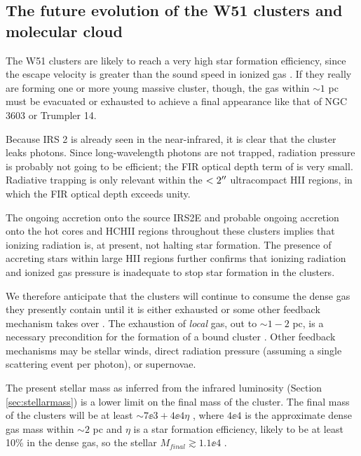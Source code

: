
\subsection{The future evolution of the W51 clusters and molecular cloud}
The W51 clusters are likely to reach a very high star formation efficiency,
since the escape velocity is greater than the sound speed in ionized gas
\citep{Ginsburg2012a,Bressert2012a}.  If they really are forming one or more
young massive cluster, though, the gas within $\sim 1$ pc must be evacuated or
exhausted to achieve a final appearance like that of NGC 3603 or Trumpler 14.

Because IRS 2 is already seen in the near-infrared, it is clear that
the cluster leaks photons.  Since long-wavelength photons are not trapped,
radiation pressure is probably not going to be efficient; the FIR optical depth
term of \citet{Murray2010a} is very small.  Radiative trapping is only
relevant within the $<2\mbox{$^{\prime\prime}$}$ ultracompact HII regions, in which the FIR optical
depth exceeds unity.

The ongoing accretion onto the source IRS2E and probable ongoing accretion onto
the hot cores and HCHII regions throughout these clusters implies that ionizing
radiation is, at present, not halting star formation.  The presence of
accreting stars within large HII regions further confirms that ionizing
radiation and ionized gas pressure is inadequate to stop star formation in the
clusters.

We therefore anticipate that the clusters will continue to consume the dense
gas they presently contain until it is either exhausted or some other feedback
mechanism takes over \citep{Ginsburg2012a,Bressert2012a,Ginsburg2015a}.  The
exhaustion of \emph{local} gas, out to $\sim1-2$ pc, is a necessary
precondition for the formation of a bound cluster \citep{Kruijssen2012a}.
Other feedback mechanisms may be stellar winds, direct radiation pressure
(assuming a single scattering event per photon), or supernovae.

The present stellar mass as inferred from the infrared luminosity (Section
\ref{sec:stellarmass}) is a lower limit on the final mass of the cluster.  The
final mass of the clusters will be at least $\sim7\ee{3} + 4\ee{4} \eta$ \msun,
where $4\ee{4}$ \msun is the approximate dense gas mass within $\sim2$ pc and
$\eta$ is a star formation efficiency, likely to be at least 10\% in the dense
gas, so the stellar $M_{final} \gtrsim 1.1\ee{4}$ \msun.

